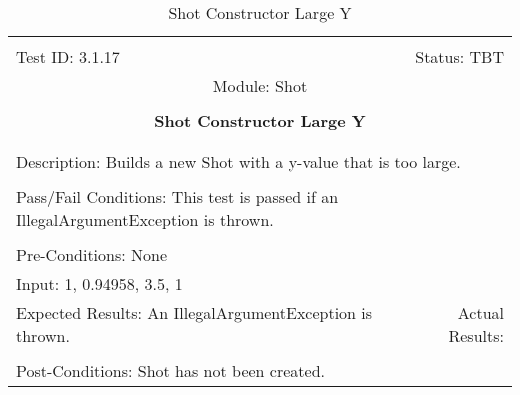 \documentclass[titlepage]{article}
\begin{document}
\begin{center}%
\begin{table}[h!]
\begin{tabular}{|l r|}\hline&\\[-2mm]
	Test ID: 3.1.17	&Status: TBT\\[-3mm]
	\multicolumn{2}{|c|}{Module: Shot}\\&\\
	\multicolumn{2}{|c|}{\textbf{\large{Shot Constructor Large Y}}}\\&\\\hline&\\[-3mm]
	\multicolumn{2}{|p{\textwidth}|}{Description: Builds a new Shot with a y-value that is too large.}\\[1mm]\hline&\\[-3mm]
	\multicolumn{2}{|p{\textwidth}|}{Pass/Fail Conditions: This test is passed if an IllegalArgumentException is thrown.}\\[1mm]\hline&\\[-3mm]
	\multicolumn{2}{|p{\textwidth}|}{Pre-Conditions: None}\\[4mm]
	\multicolumn{2}{|p{\textwidth}|}{Input: 1, 0.94958, 3.5, 1}\\[2mm]\hline
	\multicolumn{1}{|p{0.49\textwidth}}{Expected Results: An IllegalArgumentException is thrown.}	&\multicolumn{1}{|p{0.45\textwidth}|}{Actual Results: }\\\hline&\\[-3mm]
	\multicolumn{2}{|p{\textwidth}|}{Post-Conditions: Shot has not been created.}\\\hline
\end{tabular}
\caption{Shot Constructor Large Y}
\end{table}
\end{center}
\newpage
\end{document}
